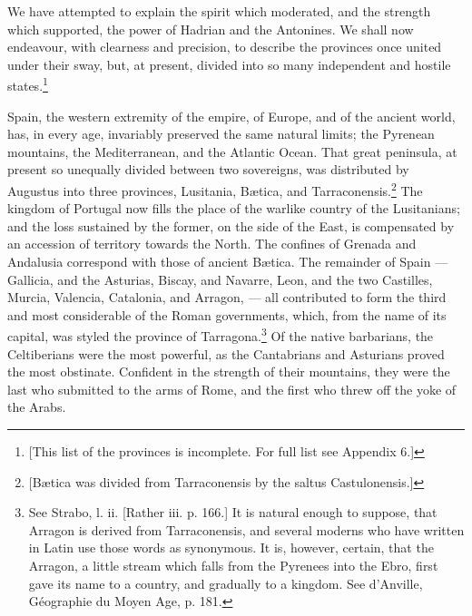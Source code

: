 We have attempted to explain the spirit which moderated, and the strength which supported, the power of Hadrian and the Antonines. We shall now endeavour, with clearness and precision, to describe the provinces once united under their sway, but, at present, divided into so many independent and hostile states.\footnote{[This list of the provinces is incomplete. For full list see Appendix 6.]}

Spain, the western extremity of the empire, of Europe, and of the ancient world, has, in every age, invariably preserved the same natural limits; the Pyrenean mountains, the Mediterranean, and the Atlantic Ocean. That great peninsula, at present so unequally divided between two sovereigns, was distributed by Augustus into three provinces, Lusitania, Bætica, and Tarraconensis.\footnote{[Bætica was divided from Tarraconensis by the saltus Castulonensis.]} The kingdom of Portugal now fills the place of the warlike country of the Lusitanians; and the loss sustained by the former, on the side of the East, is compensated by an accession of territory towards the North. The confines of Grenada and Andalusia correspond with those of ancient Bætica. The remainder of Spain \texthebrew{—} Gallicia, and the Asturias, Biscay, and Navarre, Leon, and the two Castilles, Murcia, Valencia, Catalonia, and Arragon, \texthebrew{—} all contributed to form the third and most considerable of the Roman governments, which, from the name of its capital, was styled the province of Tarragona.\footnote{See Strabo, l. ii. [Rather iii. p. 166.] It is natural enough to suppose, that Arragon is derived from Tarraconensis, and several moderns who have written in Latin use those words as synonymous. It is, however, certain, that the Arragon, a little stream which falls from the Pyrenees into the Ebro, first gave its name to a country, and gradually to a kingdom. See d\texthebrew{}’Anville, Géographie du Moyen Age, p. 181.} Of the native barbarians, the Celtiberians were the most powerful, as the Cantabrians and Asturians proved the most obstinate. Confident in the strength of their mountains, they were the last who submitted to the arms of Rome, and the first who threw off the yoke of the Arabs.

